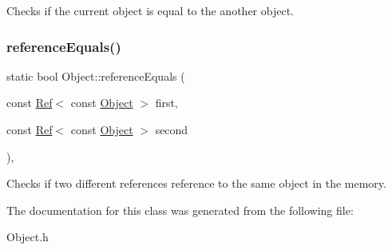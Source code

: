Checks if the current object is equal to the another object. 

\mbox{\label{class_object_a2e262342c487ea7aac9059ff0ca82b29}} 
\subsubsection{\texorpdfstring{referenceEquals()}{referenceEquals()}}
{\footnotesize\ttfamily static bool Object\+::reference\+Equals (\begin{DoxyParamCaption}\item[{const \mbox{\hyperlink{class_ref}{Ref}}$<$ const \mbox{\hyperlink{class_object}{Object}} $>$}]{first,  }\item[{const \mbox{\hyperlink{class_ref}{Ref}}$<$ const \mbox{\hyperlink{class_object}{Object}} $>$}]{second }\end{DoxyParamCaption})\hspace{0.3cm}{\ttfamily [inline]}, {\ttfamily [static]}}



Checks if two different references reference to the same object in the memory. 



The documentation for this class was generated from the following file\+:\begin{DoxyCompactItemize}
\item 
Object.\+h\end{DoxyCompactItemize}

